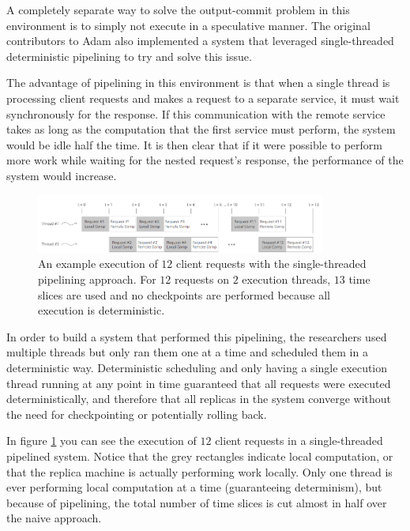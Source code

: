 \documentclass[11pt, oneside]{report}
\begin{document}
A completely separate way to solve the output-commit problem in this environment is to simply not execute in a speculative manner. 
The original contributors to Adam also implemented a system that leveraged single-threaded deterministic pipelining to try and solve this issue.

The advantage of pipelining in this environment is that when a single thread is processing client requests and makes a request to a separate service, it must wait synchronously for the response. 
If this communication with the remote service takes as long as the computation that the first service must perform, the system would be idle half the time.
It is then clear that if it were possible to perform more work while waiting for the nested request's response, the performance of the system would increase.

\begin{figure}[h]
\centering
\includegraphics[width=0.85\textwidth]{SequentialPipelined.png}
\caption{\label{seqpipe}An example execution of $12$ client requests with the single-threaded pipelining approach. For $12$ requests on $2$ execution threads, $13$ time slices are used and no checkpoints are performed because all execution is deterministic.}
\end{figure}

In order to build a system that performed this pipelining, the researchers used multiple threads but only ran them one at a time and scheduled them in a deterministic way. 
Deterministic scheduling and only having a single execution thread running at any point in time guaranteed that all requests were executed deterministically, and therefore that all replicas in the system converge without the need for checkpointing or potentially rolling back.

In figure \ref{seqpipe} you can see the execution of $12$ client requests in a single-threaded pipelined system. Notice that the grey rectangles indicate local computation, or that the replica machine is actually performing work locally. Only one thread is ever performing local computation at a time (guaranteeing determinism), but because of pipelining, the total number of time slices is cut almost in half over the naive approach.
\end{document}
